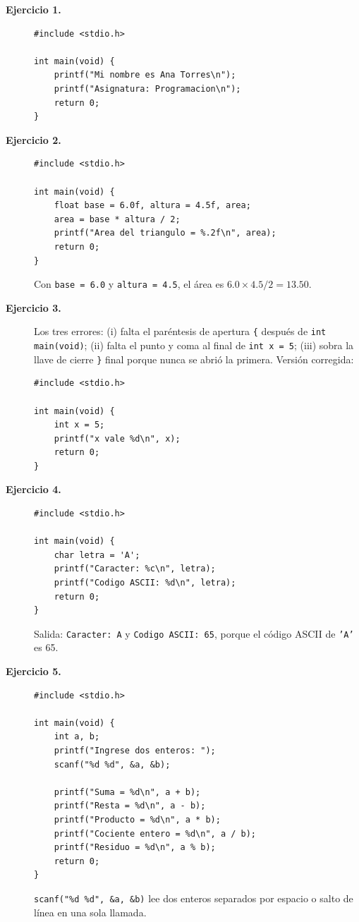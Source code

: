 \documentclass[11pt,letterpaper]{article}
\theoremstyle{definition}
\begin{document}
\begin{description}

\item[\textbf{Ejercicio 1.}]
\begin{lstlisting}
#include <stdio.h>

int main(void) {
    printf("Mi nombre es Ana Torres\n");
    printf("Asignatura: Programacion\n");
    return 0;
}
\end{lstlisting}

\item[\textbf{Ejercicio 2.}]
\begin{lstlisting}
#include <stdio.h>

int main(void) {
    float base = 6.0f, altura = 4.5f, area;
    area = base * altura / 2;
    printf("Area del triangulo = %.2f\n", area);
    return 0;
}
\end{lstlisting}
Con \texttt{base = 6.0} y \texttt{altura = 4.5}, el área es $6.0 \times 4.5 / 2 = 13.50$.

\item[\textbf{Ejercicio 3.}]
Los tres errores: (i) falta el paréntesis de apertura \texttt{\{} después de
\texttt{int main(void)}; (ii) falta el punto y coma al final de \texttt{int x = 5}; (iii) sobra la
llave de cierre \texttt{\}} final porque nunca se abrió la primera. Versión corregida:
\begin{lstlisting}
#include <stdio.h>

int main(void) {
    int x = 5;
    printf("x vale %d\n", x);
    return 0;
}
\end{lstlisting}

\item[\textbf{Ejercicio 4.}]
\begin{lstlisting}
#include <stdio.h>

int main(void) {
    char letra = 'A';
    printf("Caracter: %c\n", letra);
    printf("Codigo ASCII: %d\n", letra);
    return 0;
}
\end{lstlisting}
Salida: \texttt{Caracter: A} y \texttt{Codigo ASCII: 65}, porque el código ASCII de \texttt{'A'} es
65.

\item[\textbf{Ejercicio 5.}]
\begin{lstlisting}
#include <stdio.h>

int main(void) {
    int a, b;
    printf("Ingrese dos enteros: ");
    scanf("%d %d", &a, &b);

    printf("Suma = %d\n", a + b);
    printf("Resta = %d\n", a - b);
    printf("Producto = %d\n", a * b);
    printf("Cociente entero = %d\n", a / b);
    printf("Residuo = %d\n", a % b);
    return 0;
}
\end{lstlisting}
\texttt{scanf("\%d \%d", \&a, \&b)} lee dos enteros separados por espacio o salto de línea en una
sola llamada.


\end{description}
\end{document}
